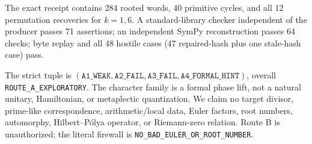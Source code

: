 \documentclass[10pt]{article}
\begin{document}
The exact receipt contains 284 rooted words, 40 primitive cycles, and all 12
permutation recoveries for $k=1,6$.  A standard-library checker independent
of the producer passes 71 assertions; an independent SymPy reconstruction
passes 64 checks; byte replay and all 48 hostile cases (47 repaired-hash plus
one stale-hash case) pass.

The strict tuple is $(\texttt{A1\_WEAK},\texttt{A2\_FAIL},
\texttt{A3\_FAIL},\texttt{A4\_FORMAL\_HINT})$, overall
\texttt{ROUTE\_A\_EXPLORATORY}.  The character family is a formal phase lift,
not a natural unitary, Hamiltonian, or metaplectic quantization.  We claim no
target divisor, prime-like correspondence, arithmetic/local data, Euler
factors, root numbers, automorphy, Hilbert--P\'olya operator, or Riemann-zero
relation.  Route B is unauthorized; the literal firewall is
\texttt{NO\_BAD\_EULER\_OR\_ROOT\_NUMBER}.
\end{document}
